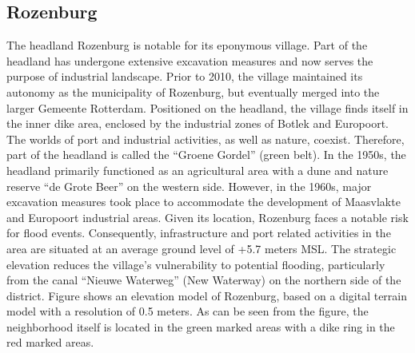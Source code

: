 \subsection{Rozenburg}
The headland Rozenburg is notable for its eponymous village. Part of the headland has undergone extensive excavation measures and now serves the purpose of industrial landscape. Prior to 2010, the village maintained its autonomy as the municipality of Rozenburg, but eventually merged into the larger Gemeente Rotterdam. Positioned on the headland, the village finds itself in the inner dike area, enclosed by the industrial zones of Botlek and Europoort. The worlds of port and industrial activities, as well as nature, coexist. Therefore, part of the headland is called the “Groene Gordel” (green belt). In the 1950s, the headland primarily functioned as an agricultural area with a dune and nature reserve “de Grote Beer” on the western side. However, in the 1960s, major excavation measures took place to accommodate the development of Maasvlakte and Europoort industrial areas. Given its location, Rozenburg faces a notable risk for flood events. Consequently, infrastructure and port related activities in the area are situated at an average ground level of +5.7 meters MSL. The strategic elevation reduces the village’s vulnerability to potential flooding, particularly from the canal “Nieuwe Waterweg” (New Waterway) on the northern side of the district. Figure  shows an elevation model of Rozenburg, based on a digital terrain model with a resolution of 0.5 meters. As can be seen from the figure, the neighborhood itself is located in the green marked areas with a dike ring in the red marked areas.


